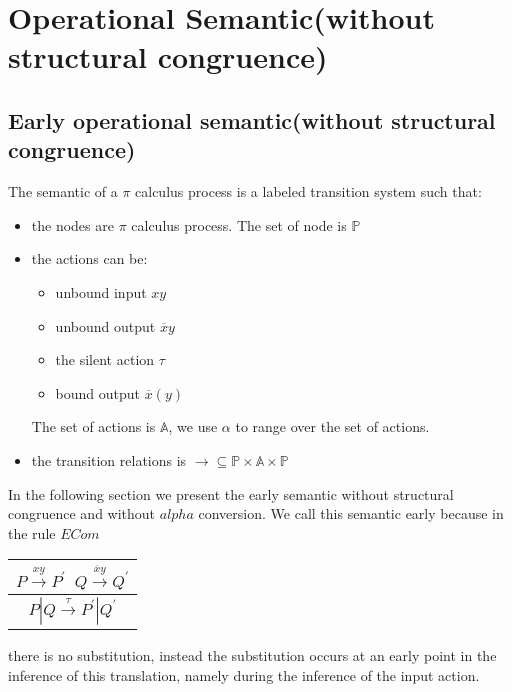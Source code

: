 \section{Operational Semantic(without structural congruence)}
\subsection{Early operational semantic(without structural congruence)}
The semantic of a $\pi$ calculus process is a labeled transition system such that:
\begin{itemize}
  \item 
    the nodes are $\pi$ calculus process. The set of node is $\mathbb{P}$
  \item
    the actions can be:
    \begin{itemize}
      \item unbound input $xy$
      \item unbound output $\overline{x}y$
      \item the silent action $\tau$
      \item bound output $\overline{x}(y)$
    \end{itemize}
    The set of actions is $\mathbb{A}$, we use $\alpha$ to range over the set of actions.
  \item
    the transition relations is $\rightarrow\subseteq \mathbb{P}\times \mathbb{A}\times \mathbb{P}$
\end{itemize}
In the following section we present the early semantic without structural congruence and without $alpha$ conversion. We call this semantic early because in the rule $ECom$
\begin{center}
  \begin{tabular}{c}
    $P \xrightarrow{xy} P^{'}\;\; Q\xrightarrow{\overline{x}y} Q^{'}$\\
    \hline
    $P|Q \xrightarrow{\tau} P^{'}|Q^{'}$
  \end{tabular}
\end{center}
there is no substitution, instead the substitution occurs at an early point in the inference of this translation, namely during the inference of the input action. 


